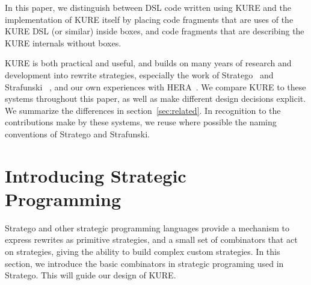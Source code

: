 \documentclass{article}
\begin{document}
In this paper, we distinguish between DSL code written using KURE and the implementation of KURE itself by placing code
fragments that are uses of the KURE DSL (or similar) inside boxes, and code fragments that are describing the KURE
internals without boxes.

KURE is both practical and useful, and builds on many years of research and development into rewrite strategies, especially the work of Stratego~\cite{Vis04.strategoxt} and Strafunski ~\cite{LV02-PADL}, and our own experiences with HERA~\cite{gillhera06}.
We compare KURE to these systems throughout this paper, as well as make different design decisions explicit.
We summarize the differences in section~\ref{sec:related}.
In recognition to the contributions make by these systems, we reuse where possible the naming conventions of Stratego and Strafunski. 

\newpage\section{Introducing Strategic Programming}\label{intro:stra-prog}

Stratego and other strategic programming languages provide 
a mechanism to express rewrites as primitive strategies, and 
a small set of combinators that act on strategies, giving the
ability to build complex custom strategies.
In this section, we introduce the basic combinators in strategic programing used in Stratego.
This will guide our design of KURE.
\end{document}
